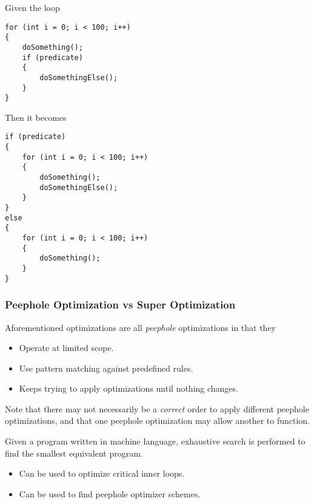 \begin{example}
    Given the loop
    \begin{verbatim}
for (int i = 0; i < 100; i++)
{
    doSomething();
    if (predicate)
    {
        doSomethingElse();
    }
}
    \end{verbatim}
    
    Then it becomes
    \begin{verbatim}
if (predicate)
{
    for (int i = 0; i < 100; i++)
    {
        doSomething();
        doSomethingElse();   
    }
} 
else 
{
    for (int i = 0; i < 100; i++)
    {
        doSomething();
    }
}
    \end{verbatim}
\end{example}

\subsubsection{Peephole Optimization vs Super Optimization}

\begin{definition}
    Aforementioned optimizations are all \textit{peephole} optimizations in that they
    \begin{itemize}
        \item Operate at limited scope.
        \item Use pattern matching against predefined rules.
        \item Keeps trying to apply optimizations until nothing changes.
    \end{itemize}
    
    Note that there may not necessarily be a \textit{correct} order to apply different peephole optimizations, and that one peephole optimization may allow another to function.
\end{definition}

\begin{definition}
    Given a program written in machine language, exhaustive search is performed to find the smallest equivalent program.
    \begin{itemize}
        \item Can be used to optimize critical inner loops.
        \item Can be used to find peephole optimizer schemes.
    \end{itemize}
\end{definition}
